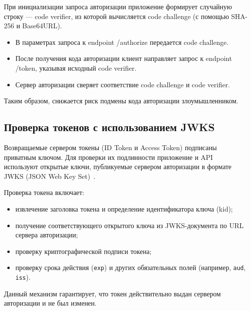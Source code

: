 При инициализации запроса авторизации приложение формирует случайную строку --- code verifier, из которой вычисляется code challenge (с помощью SHA-256 и Base64URL).  
\begin{itemize}
	\item В параметрах запроса к endpoint /authorize передается code challenge.  
	\item После получения кода авторизации клиент направляет запрос к endpoint /token, указывая исходный code verifier.  
	\item Сервер авторизации сверяет соответствие code challenge и code verifier.  
\end{itemize}
Таким образом, снижается риск подмены кода авторизации злоумышленником.

\subsection{Проверка токенов с использованием JWKS}
Возвращаемые сервером токены (ID Token и Access Token) подписаны приватным ключом.  
Для проверки их подлинности приложение и API используют открытые ключи, публикуемые сервером авторизации в формате JWKS (JSON Web Key \mbox{Set) \cite{jwks}.}  

Проверка токена включает:  
\begin{itemize}
	\item извлечение заголовка токена и определение идентификатора ключа (kid);  
	\item получение соответствующего открытого ключа из JWKS-документа по URL сервера авторизации;  
	\item проверку криптографической подписи токена;  
	\item проверку срока действия (\texttt{exp}) и других обязательных полей (например, \texttt{aud}, \texttt{iss}).  
\end{itemize}

Данный механизм гарантирует, что токен действительно выдан сервером авторизации и не был изменен.
